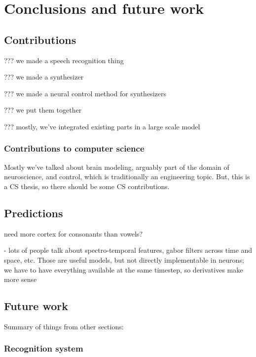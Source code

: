 \chapter{Conclusions and future work}



\section{Contributions}

??? we made a speech recognition thing

??? we made a synthesizer

??? we made a neural control method for synthesizers

??? we put them together

??? mostly, we've integrated existing parts in a large scale model

\subsection{Contributions to computer science}

Mostly we've talked about brain modeling,
arguably part of the domain of neuroscience,
and control, which is traditionally an engineering topic.
But, this is a CS thesis, so there should be some CS contributions.

\section{Predictions}

need more cortex for consonants than vowels?

- lots of people talk about spectro-temporal features,
  gabor filters across time and space, etc.
  Those are useful models, but not directly implementable
  in neurons; we have to have everything available at
  the same timestep, so derivatives make more sense

\section{Future work}

Summary of things from other sections:

\subsection{Recognition system}


